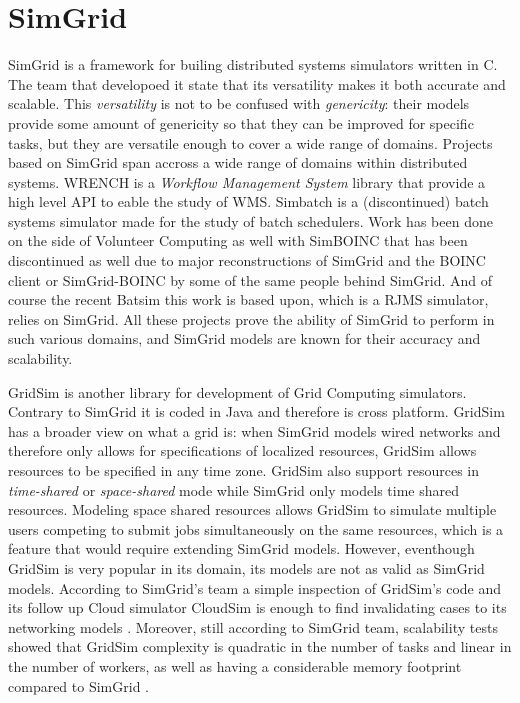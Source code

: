 \section{SimGrid}

SimGrid \cite{casanova:hal-01017319} is a framework for builing distributed
systems simulators written in C.  The team that developoed it state that its
versatility makes it both accurate and scalable. This \textit{versatility} is
not to be confused with \textit{genericity}: their models provide some amount
of genericity so that they can be improved for specific tasks, but they are
versatile enough to cover a wide range of domains. Projects based on SimGrid
span accross a wide range of domains within distributed systems. WRENCH
\cite{wrench} is a \textit{Workflow Management System} library that provide a
high level API to eable the study of WMS. Simbatch \cite{simbatch} is a
(discontinued) batch systems simulator made for the study of batch schedulers.
Work has been done on the side of Volunteer Computing as well with SimBOINC
\cite{kondo2007simboinc} that has been discontinued as well due to major
reconstructions of SimGrid and the BOINC client or SimGrid-BOINC
\cite{simgrid-boinc} by some of the same people behind SimGrid. And of course
the recent Batsim \cite{dutot:hal-01333471} this work is based upon, which is a
RJMS simulator, relies on SimGrid. All these projects prove the ability of
SimGrid to perform in such various domains, and SimGrid models are known for
their accuracy and scalability.

GridSim \cite{gridsim} is another library for development of Grid Computing
simulators. Contrary to SimGrid it is coded in Java and therefore is cross
platform. GridSim has a broader view on what a grid is: when SimGrid models
wired networks and therefore only allows for specifications of localized
resources, GridSim allows resources to be specified in any time zone. GridSim
also support resources in \textit{time-shared} or \textit{space-shared} mode
while SimGrid only models time shared resources. Modeling space shared
resources allows GridSim to simulate multiple users competing to submit jobs
simultaneously on the same resources, which is a feature that would require
extending SimGrid models.  However, eventhough GridSim is very popular in its
domain, its models are not as valid as SimGrid models. According to SimGrid's
team a simple inspection of GridSim's code and its follow up Cloud simulator
CloudSim \cite{cloudsim} is enough to find invalidating cases to its networking
models \cite{10.1145/2517448}. Moreover, still according to SimGrid team,
scalability tests showed that GridSim complexity is quadratic in the number of
tasks and linear in the number of workers, as well as having a considerable
memory footprint compared to SimGrid \cite{casanova:hal-01017319}.


